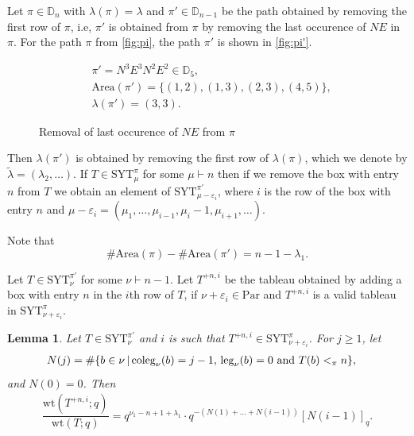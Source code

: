 \documentclass[12pt,reqno]{amsart}
\theoremstyle{plain}
\newtheorem{lemma}[theorem]{Lemma}
\theoremstyle{definition}
\theoremstyle{remark}
\theoremstyle{example}
\numberwithin{equation}{section}
\newcommand\Par{\mathrm{Par}}
\newcommand\leg{\mathrm{leg}}
\newcommand{\coleg}{\mathrm{coleg}}
\newcommand{\SYT}{\mathrm{SYT}}
\newcommand{\wt}{\mathrm{wt}}
\newcommand{\Area}{\mathrm{Area}}
\newcommand{\DD}{\mathbb{D}}
\newcommand{\NEpath}[4]{
	\fill[white!25]  (#1) rectangle +(#2,#3);
	\fill[fill=white]
	(#1)
	\foreach \dir in {#4}{
		\ifnum\dir=0
		-- ++(1,0)
		\else
		-- ++(0,1)
		\fi
	} |- (#1);
	\draw[help lines] (#1) grid +(#2,#3);
	\draw[dashed] (#1) -- +(#3,#3);
	\foreach \x in {1,...,#2} {
		\node[below,gray] at ($(#1) + (\x-0.5, -0.3)$) {\x};
	}
	
	\foreach \y in {1,...,#3} {
		\node[left,gray] at ($(#1) + (-0.3, \y-0.5)$) {\y};
	}
	\coordinate (prev) at (#1);
	\foreach \dir in {#4}{
		\ifnum\dir=0
		\coordinate (dep) at (1,0);
		\else
		\coordinate (dep) at (0,1);
		\fi
		\draw[line width=2pt,-stealth] (prev) -- ++(dep) coordinate (prev);
	};
}
\begin{document}
Let $\pi \in \DD_n$ with $\lambda(\pi) = \lambda$ and $\pi' \in \DD_{n-1}$ be the path obtained by removing the first row of $\pi$, i.e, $\pi'$ is obtained from $\pi$ by removing the last occurence of $NE$ in $\pi$. For the path $\pi$ from \autoref{fig:pi}, the path $\pi'$ is shown in \autoref{fig:pi'}.

\begin{figure}[h]
	\begin{minipage}{0.45 \textwidth}
	\end{minipage}
	\hfill
	\begin{minipage}{0.45 \textwidth}
		\begin{align*}
			&\pi' = N^3E^3N^2E^2 \in \DD_5,
			\\
			&\Area(\pi') = \{(1,2),(1,3),(2,3),(4,5)\},
			\\
			&\lambda(\pi') = (3,3). 	
		\end{align*}
	\end{minipage}
	\caption{Removal of last occurence of $NE$ from $\pi$}
	\label{fig:pi'}
\end{figure}
 

Then $\lambda(\pi')$ is obtained by removing the first row of $\lambda(\pi)$, which we denote by $\widetilde{\lambda} = (\lambda_2,\ldots).$ If $T \in \SYT^\pi_\mu$ for some $\mu \vdash n$ then if we remove the box with entry $n$ from $T$ we obtain an element of $\SYT^{\pi'}_{\mu-\varepsilon_i}$, where $i$ is the row of the box with entry $n$ and $\mu-\varepsilon_i = (\mu_1,\ldots,\mu_{i-1},\mu_i-1,\mu_{i+1},\ldots)$.

Note that $$\#\Area(\pi) - \#\Area(\pi') = n-1-\lambda_1.$$ 


Let $T \in \SYT^{\pi'}_\nu$ for some $\nu \vdash n-1$. Let $T^{+n,i}$ be the tableau obtained by adding a box with entry $n$ in the $i$th row of $T$, if $\nu+\varepsilon_i \in \Par$ and $T^{+n,i}$ is a valid tableau in $\SYT^{\pi}_{\nu+\varepsilon_i}$.

\begin{lemma}
	Let $T \in \SYT^{\pi'}_\nu$ and $i$ is such that $T^{+n,i} \in \SYT^\pi_{\nu+\varepsilon_i}$. For $j \geq 1$, let \begin{align}\label{eq:Njdef}
		N(j) &= \# \{ b \in \nu\,|\, \coleg_\nu(b) = j-1 ,\, \leg_\nu(b) = 0 \hbox{ and } T(b) <_\pi n \}, 
	\end{align} and $N(0) = 0$.
	Then 
	\begin{align}\label{eq:wtcomparisongen}
		\dfrac{\wt(T^{+n,i};q)}{\wt(T;q)}=q^{\nu_1 - n + 1  + \lambda_1} \cdot q^{- (N(1)+\ldots + N(i-1))} [N(i-1)]_q.
	\end{align}
\end{lemma}
\end{document}
